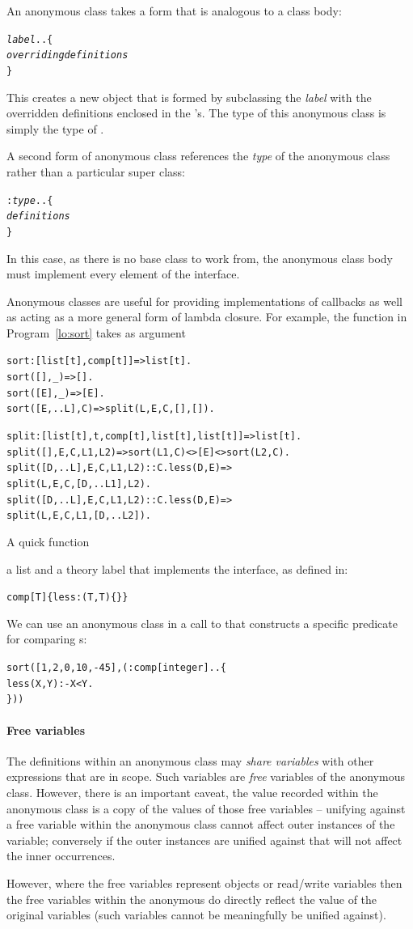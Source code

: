 An anonymous class takes a form that is analogous to a class body:
\begin{alltt}
\emph{label}..\{
  \emph{overriding definitions}
\}
\end{alltt}
This creates a new object that is formed by subclassing the \emph{label} with the overridden definitions enclosed in the \q{\{\}}'s. The type of this anonymous class is simply the type of .

A second form of anonymous class references the \emph{type} of the anonymous class rather than a particular super class:
\begin{alltt}
:\emph{type}..\{
  \emph{definitions}
\}
\end{alltt}
In this case, as there is no base class to work from, the anonymous class body must implement every element of the  interface.

Anonymous classes are useful for providing implementations of callbacks as well as acting as a more general form of lambda closure. For example, the  function in Program~\vref{lo:sort} takes as argument
\begin{program}
\vspace{0.5ex}
\begin{alltt}
sort:[list[t],comp[t]]=>list[t].
sort([],_) => [].
sort([E],_) => [E].
sort([E,..L],C) => split(L,E,C,[],[]).

split:[list[t],t,comp[t],list[t],list[t]]=>list[t].
split([],E,C,L1,L2) => sort(L1,C)<>[E]<>sort(L2,C).
split([D,..L],E,C,L1,L2)::C.less(D,E)=>
   split(L,E,C,[D,..L1],L2).
split([D,..L],E,C,L1,L2)::\nasf{}C.less(D,E)=>
   split(L,E,C,L1,[D,..L2]).
\end{alltt}
\vspace{-2ex}
\caption{A quick  function\label{lo:sort}}
\end{program}
a list and a theory label that implements the  interface, as defined in:
\begin{alltt}
comp[T] \impl \{ less:(T,T)\{\} \}
\end{alltt}
We can use an anonymous class in a call to  that constructs a specific predicate for comparing s:
\begin{alltt}
sort([1,2,0,10,-45],(:comp[integer]..\{
  less(X,Y) :- X<Y.
\}))
\end{alltt}

\paragraph{Free variables}
The definitions within an anonymous class may \emph{share variables} with other expressions that are in scope. Such variables are \emph{free} variables of the anonymous class. However, there is an important caveat, the value recorded within the anonymous class is a copy of the values of those free variables -- unifying against a free variable within the anonymous class cannot affect outer instances of the variable; conversely if the outer instances are unified against that will not affect the inner occurrences.

However, where the free variables represent objects or read/write variables then the free variables within the anonymous do directly reflect the value of the original variables (such variables cannot be meaningfully be unified against).

